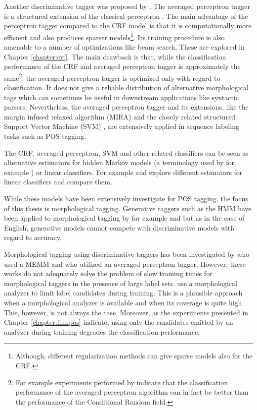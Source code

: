 Another discriminative tagger was proposed by \cite{Collins2002}. The
averaged perceptron tagger is a structured extension of the classical
perceptron \cite{Rosenblatt1958}. The main advantage of the perceptron
tagger compared to the CRF model is that it is computationally more
efficient and also produces sparser models\footnote{Although,
  different regularization methods can give sparse models also for the
  CRF.}. Its training procedure is also amenable to a number of
optimizations like beam search. These are explored in Chapter
\ref{chapter:crf}. The main drawback is that, while the classification
performance of the CRF and averaged perceptron tagger is approximately
the same\footnote{For example experiments performed by
  \cite{Nguyen2007} indicate that the classification performance of
  the averaged perceptron algorithm can in fact be better than the
  performance of the Conditional Random field.}, the averaged
perceptron tagger is optimized only with regard to classification. It
does not give a reliable distribution of alternative morphological
tags which can sometimes be useful in downstream applications like
syntactic parsers. Nevertheless, the averaged perceptron tagger and
its extensions, like the margin infused relaxed algorithm (MIRA)
\cite{Taskar2003} and the closely related structured Support Vector
Machine (SVM) \citep{Tsochantaridis2005}, are extensively applied in
sequence labeling tasks such as POS tagging.

The CRF, averaged perceptron, SVM and other related classifiers can be
seen as alternative estimators for hidden Markov models (a terminology
used by for example \cite{Collins2002}) or linear classifiers. For
example \cite{Ruokolainen2014} and \cite{Nguyen2007} explore different
estimators for linear classifiers and compare them.

While these models have been extensively investigate for POS tagging,
the focus of this thesis is morphological tagging. Generative taggers
such as the HMM have been applied to morphological tagging by for
example \cite{Halacsy2007} and \cite{Silfverberg2011} but as in the
case of English, generative models cannot compete with discriminative
models with regard to accuracy.

Morphological tagging using discriminative taggers has been
investigated by \cite{Chrupala2009} who used a MEMM and
\cite{Spoustova2009} who utilized an averaged perceptron
tagger. However, these works do not adequately solve the problem of
slow training times for morphological taggers in the presence of large
label sets. \cite{Spoustova2009} use a morphological analyzer to limit
label candidates during training. This is a plausible approach when a
morphological analyzer is available and when its coverage is quite
high. This, however, is not always the case. Moreover, as the
experiments presented in Chapter \ref{chapter:finnpos} indicate, using
only the candidates emitted by an analyzer during training degrades
the classification performance.

